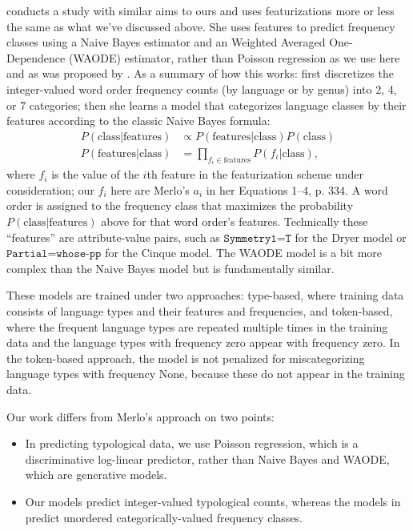 \documentclass[11pt]{article}
\begin{document}
\citet{merlo2015predicting} conducts a study with similar aims to ours and uses featurizations more or less the same as what we've discussed above.
She uses features to predict frequency classes using a Naive Bayes estimator and an Weighted Averaged One-Dependence (WAODE) estimator, rather than Poisson regression as we use here and as was proposed by \citet{cysouw2010dealing}.
As a summary of how this works: \citet{merlo2015predicting} first discretizes the integer-valued word order frequency counts (by language or by genus) into 2, 4, or 7 categories; then she learns a model that categorizes language classes by their features according to the classic Naive Bayes formula:
\begin{align*}
  \nonumber
  P(\text{class}|\text{features}) &\propto P(\text{features}|\text{class}) P(\text{class}) \\
  \nonumber
  P(\text{features}|\text{class}) &= \prod_{f_i \in \text{features}} P(f_i | \text{class}),
\end{align*}
where $f_i$ is the value of the $i$th feature in the featurization scheme under consideration; our $f_i$ here are Merlo's $a_i$ in her Equations 1--4, p. 334. A word order is assigned to the frequency class that maximizes the probability $P(\text{class}|\text{features})$ above for that word order's features.
Technically these ``features'' are attribute-value pairs, such as $\texttt{Symmetry1=T}$ for the Dryer model or $\texttt{Partial=whose-pp}$ for the Cinque model.
The WAODE model is a bit more complex than the Naive Bayes model but is fundamentally similar.

These models are trained under two approaches: type-based, where training data consists of language types and their features and frequencies, and token-based, where the frequent language types are repeated multiple times in the training data and the language types with frequency zero appear with frequency zero.
In the token-based approach, the model is not penalized for miscategorizing language types with frequency None, because these do not appear in the training data.

Our work differs from Merlo's approach on two points:
\begin{itemize}
\item In predicting typological data, we use Poisson regression, which is a discriminative log-linear predictor, rather than Naive Bayes and WAODE, which are generative models.
\item Our models predict integer-valued typological counts, whereas the models in \citet{merlo2015predicting} predict unordered categorically-valued frequency classes.
\end{itemize}
\end{document}
